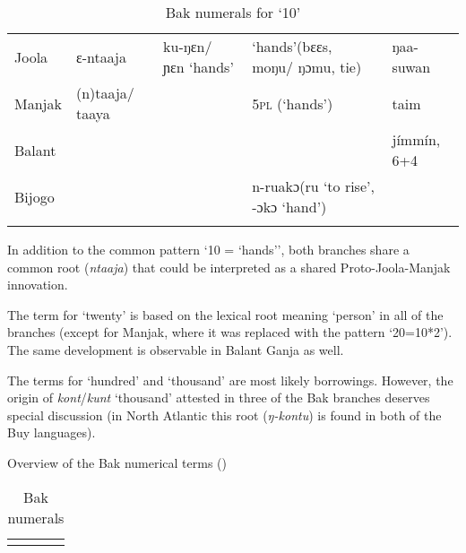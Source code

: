 {

\begin{table}
\caption{\label{tab:3:246}Bak numerals for `10'}


\begin{tabularx}{\textwidth}{llQQl}
\lsptoprule

{Joola} & ɛ-ntaaja\footnotemark{} & ku-ŋɛn/ ɲɛn `hands' & `hands'\newline (bɛɛs, moŋu/ ŋɔmu, tie) & ŋaa-suwan\\
{Manjak} & (n)taaja/ taaya &  & 5\textsc{pl} (‘hands’) & taim\\
{Balant} &  &  &  & jímmín, 6+4\\
{Bijogo} &  &  & n-ruakɔ\newline (ru ‘to rise’, -ɔkɔ ‘hand’) & \\
\lspbottomrule
\end{tabularx}
\end{table}

In addition to the common pattern ‘10 = ‘hands’’, both branches share a common root (\textit{ntaaja}) that could be interpreted as a shared Proto-Joola-Manjak innovation.


The term for ‘twenty’ is based on the lexical root meaning ‘person’ in all of the branches (except for Manjak, where it was replaced with the pattern ‘20=10*2’). The same development is observable in Balant Ganja as well.

The terms for ‘hundred’ and ‘thousand’ are most likely borrowings. However, the origin of \textit{kont}/\textit{kunt} ‘thousand’ attested in three of the Bak branches deserves special discussion (in North Atlantic this root (\textit{ŋ-kontu}) is found in both of the Buy languages).

Overview of the Bak numerical terms ()

\begin{table}
\caption{\label{tab:3:247}Bak numerals}


\begin{tabularx}{\textwidth}{ll@{}rQ}
\lsptoprule


\end{tabularx}
\end{table}}
